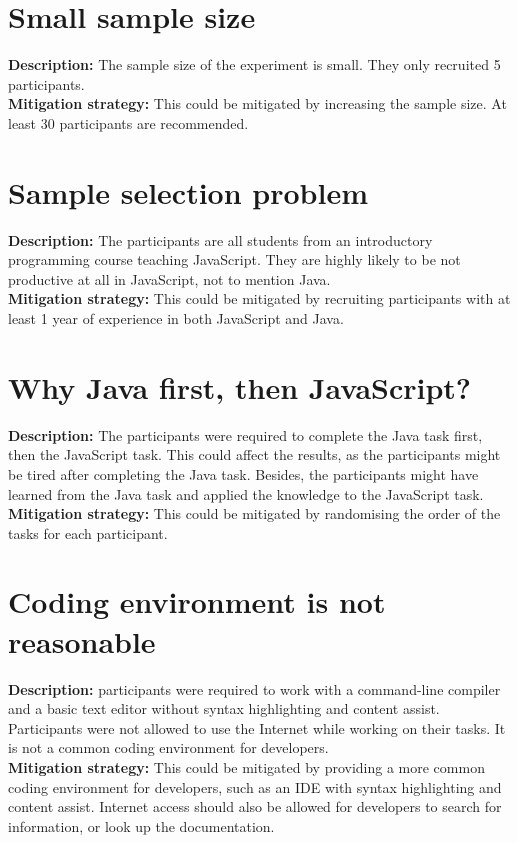 \documentclass{article}
\begin{document}
\section{Small sample size}
\textbf{Description:} The sample size of the experiment is small. They only recruited 5 participants.\\
\textbf{Mitigation strategy:} This could be mitigated by increasing the sample size. At least 30 participants are recommended.

\section{Sample selection problem}
\textbf{Description:} The participants are all students from an introductory programming course teaching JavaScript. They are highly likely to be not productive at all in JavaScript, not to mention Java.\\
\textbf{Mitigation strategy:} This could be mitigated by recruiting participants with at least 1 year of experience in both JavaScript and Java.

\section{Why Java first, then JavaScript?}
\textbf{Description:} The participants were required to complete the Java task first, then the JavaScript task. This could affect the results, as the participants might be tired after completing the Java task. Besides, the participants might have learned from the Java task and applied the knowledge to the JavaScript task.\\
\textbf{Mitigation strategy:} This could be mitigated by randomising the order of the tasks for each participant.

\section{Coding environment is not reasonable}
\textbf{Description:} participants were required to work with a
command-line compiler and a basic text editor without syntax highlighting and content assist.
Participants were not allowed to use the Internet while working on their tasks. It is not a common coding environment for developers.\\
\textbf{Mitigation strategy:} This could be mitigated by providing a more common coding environment for developers, such as an IDE with syntax highlighting and content assist. Internet access should also be allowed for developers to search for information, or look up the documentation.
\end{document}
